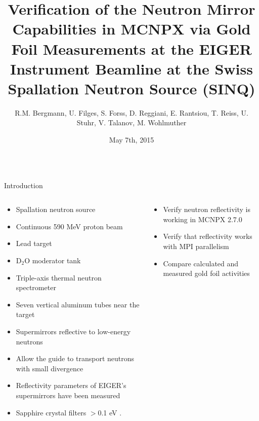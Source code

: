 \documentclass[final,t]{beamer}
\title{\huge Verification of the Neutron Mirror Capabilities in MCNPX via Gold Foil Measurements at the EIGER Instrument Beamline at the Swiss Spallation Neutron Source (SINQ) } %
\author{R.M. Bergmann, U. Filges, S. Forss, D. Reggiani, E. Rantsiou, T. Reiss, U. Stuhr, V. Talanov, M. Wohlmuther} %
\institute[PSI]{Paul Scherrer Institut, Villigen, Switzerland}
\date[May 7th, 2015]{May 7th, 2015}
\begin{document}
\begin{frame}{} 
  \begin{columns}[t]
    \begin{column}{.3\linewidth}


      \begin{block}{Introduction}

\begin{columns}
\begin{column}{.6\linewidth}
\begin{itemize}
  \item Spallation neutron source
  \item Continuous 590 MeV proton beam
  \item Lead target
  \item D$_2$O moderator tank  
\end{itemize}

\begin{itemize}
\item Triple-axis thermal neutron spectrometer 
\end{itemize}

\begin{itemize}
\item Seven vertical aluminum tubes near the target 
\end{itemize}

  \begin{itemize} 
  \item Supermirrors reflective to low-energy neutrons
  \item Allow the guide to transport neutrons with small divergence
  \item Reflectivity parameters of EIGER's supermirrors have been measured
  \item Sapphire crystal filters $>$0.1 eV \cite{freund}.
  \end{itemize}
\end{column}

\begin{column}{.4\linewidth}
  \begin{itemize}
  \item Verify neutron reflectivity is working in MCNPX 2.7.0
  \item Verify that reflectivity works with MPI parallelism
  \item Compare calculated and measured gold foil activities
  \end{itemize}
\end{column}
\end{columns}


\end{block}
\end{column}
\end{columns}
\end{frame}
\end{document}
